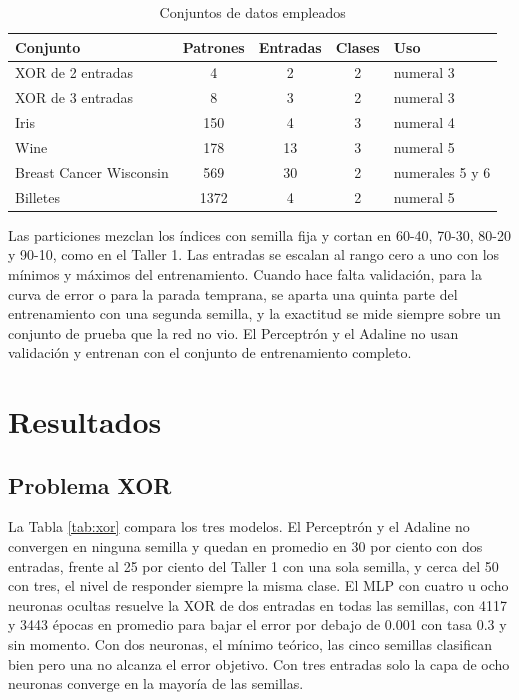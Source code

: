 \documentclass[11pt,letterpaper]{article}
\begin{document}
\begin{table}[!htb]
    \centering
    \caption{Conjuntos de datos empleados}
    \label{tab:tamanos}
    \footnotesize
    \begin{tabular}{l S[table-format=4.0] S[table-format=2.0] S[table-format=1.0] l}
        \toprule
        \textbf{Conjunto} & {\textbf{Patrones}} & {\textbf{Entradas}} & {\textbf{Clases}} & \textbf{Uso} \\
        \midrule
        XOR de 2 entradas & 4 & 2 & 2 & numeral 3 \\
        XOR de 3 entradas & 8 & 3 & 2 & numeral 3 \\
        Iris & 150 & 4 & 3 & numeral 4 \\
        Wine & 178 & 13 & 3 & numeral 5 \\
        Breast Cancer Wisconsin & 569 & 30 & 2 & numerales 5 y 6 \\
        Billetes & 1372 & 4 & 2 & numeral 5 \\
        \bottomrule
    \end{tabular}
\end{table}

Las particiones mezclan los índices con semilla fija y cortan en 60-40, 70-30, 80-20 y 90-10, como en el Taller 1. Las entradas se escalan al rango cero a uno con los mínimos y máximos del entrenamiento. Cuando hace falta validación, para la curva de error o para la parada temprana, se aparta una quinta parte del entrenamiento con una segunda semilla, y la exactitud se mide siempre sobre un conjunto de prueba que la red no vio. El Perceptrón y el Adaline no usan validación y entrenan con el conjunto de entrenamiento completo.

\section{Resultados}

\subsection{Problema XOR}

La Tabla \ref{tab:xor} compara los tres modelos. El Perceptrón y el Adaline no convergen en ninguna semilla y quedan en promedio en 30 por ciento con dos entradas, frente al 25 por ciento del Taller 1 con una sola semilla, y cerca del 50 con tres, el nivel de responder siempre la misma clase. El MLP con cuatro u ocho neuronas ocultas resuelve la XOR de dos entradas en todas las semillas, con 4117 y 3443 épocas en promedio para bajar el error por debajo de 0.001 con tasa 0.3 y sin momento. Con dos neuronas, el mínimo teórico, las cinco semillas clasifican bien pero una no alcanza el error objetivo. Con tres entradas solo la capa de ocho neuronas converge en la mayoría de las semillas.
\end{document}
